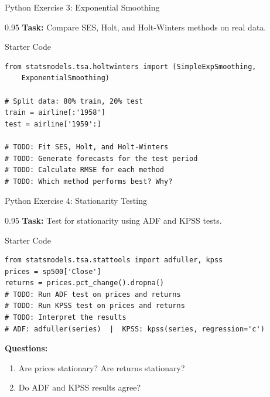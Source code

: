 \documentclass[9pt, aspectratio=169, t]{beamer}
\begin{document}
\begin{frame}[fragile]{Python Exercise 3: Exponential Smoothing}
    \begin{cminipage}{0.95\textwidth}
    \textbf{Task:} Compare SES, Holt, and Holt-Winters methods on real data.

    \vspace{0.3cm}

    \begin{block}{Starter Code}
    \small
    \begin{verbatim}
from statsmodels.tsa.holtwinters import (SimpleExpSmoothing,
    ExponentialSmoothing)

# Split data: 80% train, 20% test
train = airline[:'1958']
test = airline['1959':]

# TODO: Fit SES, Holt, and Holt-Winters
# TODO: Generate forecasts for the test period
# TODO: Calculate RMSE for each method
# TODO: Which method performs best? Why?
    \end{verbatim}
    \end{block}
    \end{cminipage}
\end{frame}

\begin{frame}[fragile]{Python Exercise 4: Stationarity Testing}
    \begin{cminipage}{0.95\textwidth}
    \textbf{Task:} Test for stationarity using ADF and KPSS tests.
    \vspace{0.2cm}
    \begin{block}{Starter Code}
    \footnotesize
    \begin{verbatim}
from statsmodels.tsa.stattools import adfuller, kpss
prices = sp500['Close']
returns = prices.pct_change().dropna()
# TODO: Run ADF test on prices and returns
# TODO: Run KPSS test on prices and returns
# TODO: Interpret the results
# ADF: adfuller(series)  |  KPSS: kpss(series, regression='c')
    \end{verbatim}
    \end{block}
    \textbf{Questions:}
    \begin{enumerate}\setlength{\itemsep}{0pt}
        \item Are prices stationary? Are returns stationary?
        \item Do ADF and KPSS results agree?
    \end{enumerate}

    \end{cminipage}
\end{frame}
\end{document}
